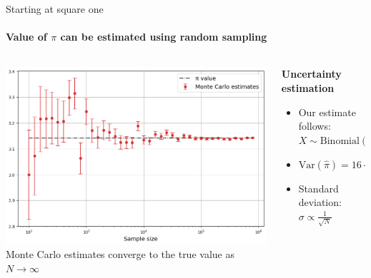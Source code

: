 \documentclass{beamer}
\begin{document}
\begin{frame}{Starting at square one}
  \framesubtitle{Value of $\pi$ can be estimated using random sampling}

  \begin{columns}[c]
    \begin{column}{0.6\textwidth}
      \begin{center}
        \includegraphics[width=\textwidth]{images/pi_convergence.png}
        \\[0.2cm]
        \small{Monte Carlo estimates converge to the true value as $N \to \infty$}
      \end{center}
    \end{column}
    \begin{column}{0.4\textwidth}
      \textbf{Uncertainty estimation}
      \begin{itemize}
        \item Our estimate follows: $X \sim \text{Binomial}(N, p)$
        \item $\text{Var}(\hat{\pi}) = 16 \cdot \frac{p(1-p)}{N}$
        \item Standard deviation: $\sigma \propto \frac{1}{\sqrt{N}}$
      \end{itemize}
    \end{column}
  \end{columns}
\end{frame}
\end{document}
